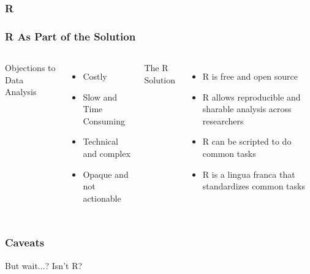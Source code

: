 \documentclass[12pt,handout]{beamer}
\begin{document}
{
\begin{frame}[plain]
\frametitle{R}
\end{frame}
}


\begin{frame}
\frametitle{R As Part of the Solution}
  \begin{columns}
  Objections to Data Analysis
  \begin{itemize}
  \item Costly
  \item Slow and Time Consuming
  \item Technical and complex
  \item Opaque and not actionable
  \end{itemize}
  The R Solution
  \begin{itemize}
  \item R is free and open source
  \item R allows reproducible and sharable analysis across researchers
  \item R can be scripted to do common tasks
  \item R is a lingua franca that standardizes common tasks
  \end{itemize}
  \end{columns}
\end{frame}


\begin{frame}
\frametitle{Caveats}
\begin{center}
\Large But wait...? Isn't R?
\end{center}
\end{frame}
\end{document}
